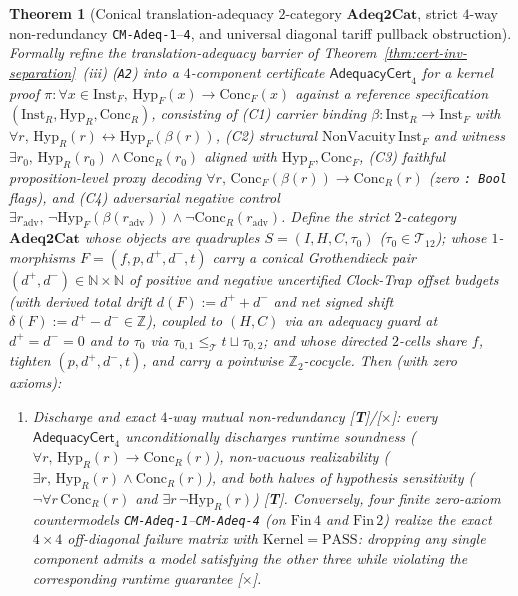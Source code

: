 \documentclass[11pt]{article}
\theoremstyle{plain}
\newtheorem{theorem}{Theorem}[section]
\theoremstyle{definition}
\begin{document}
\begin{theorem}[Conical translation-adequacy $2$-category $\mathbf{Adeq2Cat}$, strict $4$-way non-redundancy \texttt{CM-Adeq-1}--\texttt{4}, and universal diagonal tariff pullback obstruction]\label{thm:adeq2cat-and-cm-adeq}
Formally refine the translation-adequacy barrier of Theorem~\ref{thm:cert-inv-separation}~(iii) (\texttt{A2}) into a $4$-component certificate $\mathsf{AdequacyCert}_4$ for a kernel proof $\pi : \forall x \in \mathrm{Inst}_F,\, \mathrm{Hyp}_F(x) \to \mathrm{Conc}_F(x)$ against a reference specification $(\mathrm{Inst}_R, \mathrm{Hyp}_R, \mathrm{Conc}_R)$, consisting of \textup{(C1)} carrier binding $\beta : \mathrm{Inst}_R \to \mathrm{Inst}_F$ with $\forall r,\, \mathrm{Hyp}_R(r) \leftrightarrow \mathrm{Hyp}_F(\beta(r))$, \textup{(C2)} structural $\mathrm{NonVacuity}\,\mathrm{Inst}_F$ and witness $\exists r_0,\, \mathrm{Hyp}_R(r_0) \wedge \mathrm{Conc}_R(r_0)$ aligned with $\mathrm{Hyp}_F, \mathrm{Conc}_F$, \textup{(C3)} faithful proposition-level proxy decoding $\forall r,\, \mathrm{Conc}_F(\beta(r)) \to \mathrm{Conc}_R(r)$ (zero \texttt{: Bool} flags), and \textup{(C4)} adversarial negative control $\exists r_{\mathrm{adv}},\, \neg\mathrm{Hyp}_F(\beta(r_{\mathrm{adv}})) \wedge \neg\mathrm{Conc}_R(r_{\mathrm{adv}})$. Define the strict $2$-category $\mathbf{Adeq2Cat}$ whose objects are quadruples $S = (I, H, C, \tau_0)$ ($\tau_0 \in \mathcal{T}_{12}$); whose $1$-morphisms $F = (f, p, d^+, d^-, t)$ carry a \emph{conical Grothendieck pair} $(d^+, d^-) \in \mathbb{N} \times \mathbb{N}$ of positive and negative uncertified Clock-Trap offset budgets (with derived total drift $d(F) := d^+ + d^-$ and net signed shift $\delta(F) := d^+ - d^- \in \mathbb{Z}$), coupled to $(H, C)$ via an adequacy guard at $d^+ = d^- = 0$ and to $\tau_0$ via $\tau_{0,1} \le_{\mathcal{T}} t \sqcup \tau_{0,2}$; and whose directed $2$-cells share $f$, tighten $(p, d^+, d^-, t)$, and carry a pointwise $\mathbb{Z}_2$-cocycle. Then (with zero axioms):
\begin{enumerate}[nosep,label=(\roman*)]
\item \emph{Discharge and exact $4$-way mutual non-redundancy \textup{[\textbf{T}]}/\textup{[\textbf{$\times$}]}}: every $\mathsf{AdequacyCert}_4$ unconditionally discharges runtime soundness ($\forall r,\, \mathrm{Hyp}_R(r) \to \mathrm{Conc}_R(r)$), non-vacuous realizability ($\exists r,\, \mathrm{Hyp}_R(r) \wedge \mathrm{Conc}_R(r)$), and both halves of hypothesis sensitivity ($\neg\forall r\,\mathrm{Conc}_R(r)$ and $\exists r\,\neg\mathrm{Hyp}_R(r)$) \textup{[\textbf{T}]}. Conversely, four finite zero-axiom countermodels \texttt{CM-Adeq-1}--\texttt{CM-Adeq-4} (on $\mathrm{Fin}\,4$ and $\mathrm{Fin}\,2$) realize the exact $4 \times 4$ off-diagonal failure matrix with $\mathrm{Kernel} = \mathrm{PASS}$: dropping any single component admits a model satisfying the other three while violating the corresponding runtime guarantee \textup{[\textbf{$\times$}]}.

\end{enumerate}
\end{theorem}
\end{document}

